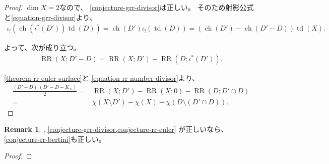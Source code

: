 \documentclass[a4paper,dvipdfmx,reqno,12pt]{amsart}
\theoremstyle{definition}
\newtheorem{remark}[theorem]{Remark}
\newcommand{\opn}[1]{\operatorname{#1}}
\numberwithin{equation}{section}
\begin{document}
\begin{proof}
$\dim X=2$なので、
\cref{conjecture-grr-divisor}は正しい。
そのため射影公式と\eqref{equation-grr-divisor}より、
\begin{align}
\iota_!(\opn{ch}(\iota^{*}(D'))\opn{td}(D))
=\opn{ch}(D')\iota_!(\opn{td}(D))
=(\opn{ch}(D')-\opn{ch}(D'-D))\opn{td}(X).
\end{align}

よって、次が成り立つ。
\begin{align}
\label{equation-rr-number-divisor}
\opn{RR}(X;D'-D)=\opn{RR}(X;D')-
\opn{RR}(D;\iota^{*}(D')).
\end{align}

\cref{theorem-rr-euler-surface}と
\eqref{equation-rr-number-divisor}より、
\begin{align}
\frac{(D'-D).(D'-D-K_X)}{2}=&
\opn{RR}(X;D')-\opn{RR}(X;0)-
\opn{RR}(D;D'\cap D) \\
=&\chi(X\setminus D')-\chi(X)-\chi(D\setminus (D'\cap D)).
\end{align}
\end{proof}

\begin{remark}

\cite[Conjecture 6.13]{demedrano2023chern},
\cref{conjecture-grr-divisor,conjecture-rr-euler}
が正しいなら、\cref{conjecture-rr-bertini}も正しい。  
\end{remark}

\begin{proof}





\end{proof}
\end{document}
